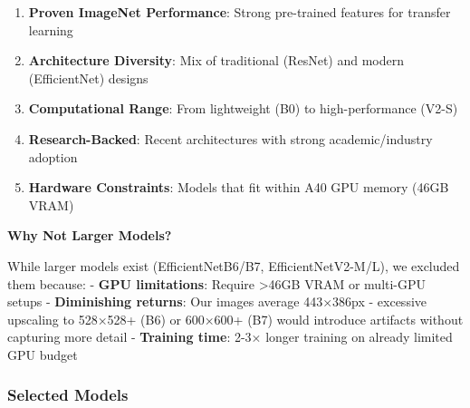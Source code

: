\documentclass[
  letterpaper,
  DIV=11,
  numbers=noendperiod]{scrartcl}
\providecommand{\tightlist}{%
  \setlength{\itemsep}{0pt}\setlength{\parskip}{0pt}}
\begin{document}
\begin{enumerate}
\def\labelenumi{\arabic{enumi}.}
\tightlist
\item
  \textbf{Proven ImageNet Performance}: Strong pre-trained features for
  transfer learning
\item
  \textbf{Architecture Diversity}: Mix of traditional (ResNet) and
  modern (EfficientNet) designs
\item
  \textbf{Computational Range}: From lightweight (B0) to
  high-performance (V2-S)
\item
  \textbf{Research-Backed}: Recent architectures with strong
  academic/industry adoption
\item
  \textbf{Hardware Constraints}: Models that fit within A40 GPU memory
  (46GB VRAM)
\end{enumerate}

\textbf{Why Not Larger Models?}

While larger models exist (EfficientNetB6/B7, EfficientNetV2-M/L), we
excluded them because: - \textbf{GPU limitations}: Require
\textgreater46GB VRAM or multi-GPU setups - \textbf{Diminishing
returns}: Our images average 443×386px - excessive upscaling to 528×528+
(B6) or 600×600+ (B7) would introduce artifacts without capturing more
detail - \textbf{Training time}: 2-3× longer training on already limited
GPU budget

\subsubsection{Selected Models}\label{selected-models}
\end{document}
